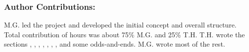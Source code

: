 \documentclass[12pt,letterpaper]{book}
\begin{document}




\subsubsection{Author Contributions:} M.G. led the project and developed the initial concept and overall structure. Total contribution of hours was about 75\% M.G. and 25\% T.H. T.H. wrote the sections , , , , , , , and some odds-and-ends. M.G. wrote most of the rest.
\end{document}
